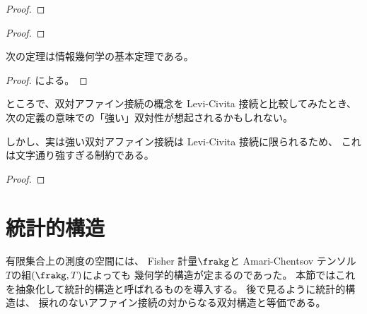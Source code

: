 \documentclass[report]{jlreq}
\begin{document}
\begin{proposition}[双対アファイン接続の基本性質]
    \TODO{}
\end{proposition}

\begin{proof}
    \TODO{}
\end{proof}

\begin{proposition}[双対アファイン接続と平行移動]
    \TODO{}
\end{proposition}

\begin{proof}
    \TODO{}
\end{proof}

次の定理は情報幾何学の基本定理である\cite{nielsen_elementary_2020}。

\begin{proposition}[双対アファイン接続と曲率]
\end{proposition}

\begin{proof}
    \cite[p.226]{calin_geometric_2014}による。
    \TODO{}
\end{proof}

ところで、双対アファイン接続の概念を
Levi-Civita 接続と比較してみたとき、
次の定義の意味での「強い」双対性が想起されるかもしれない。

\begin{definition}[強い双対アファイン接続]
    \TODO{}
\end{definition}

しかし、実は強い双対アファイン接続は
Levi-Civita 接続に限られるため、
これは文字通り強すぎる制約である。

\begin{proposition}
    \TODO{}
\end{proposition}

\begin{proof}
    \TODO{}
\end{proof}

%
\section{統計的構造}

有限集合上の測度の空間には、
Fisher 計量$\frakg$と
Amari-Chentsov テンソル$T$の組$(\frakg, T)$によっても
幾何学的構造が定まるのであった。
本節ではこれを抽象化して統計的構造と呼ばれるものを導入する。
後で見るように統計的構造は、
捩れのないアファイン接続の対からなる双対構造と等価である。
\end{document}
